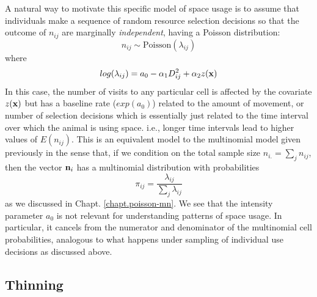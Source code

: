 A natural way to motivate this specific model of space usage is to
assume that individuals make a sequence of random resource selection
decisions so that the outcome of $n_{ij}$ are marginally {\it
  independent}, having a Poisson distribution:
\[
 n_{ij} \sim \mbox{Poisson}( \lambda_{ij})
\]
where
\[
 log(\lambda_{ij}) = a_{0} -\alpha_{1} D_{ij}^{2} +  \alpha_{2} z({\bf x})
\]
In this case,
 the number of visits to any particular cell is affected by
the covariate $z({\bf x})$ but has a baseline rate ($exp(a_{0})$) related to the amount
of movement, or number of selection decisions which is essentially
just related to the time interval over which the animal is using
space. i.e., longer time intervals lead to higher values of
$E(n_{ij})$.
This is an equivalent model to the multinomial model given previously
in the sense that, if we condition on the total sample size $n_{i.} =
\sum_{j} n_{ij}$, then the vector ${\bf n}_{i}$ has a multinomial
distribution with probabilities
\[
 \pi_{ij} = \frac{\lambda_{ij}}{ \sum_{j} \lambda_{ij}}
\]
as we discussed in Chapt. \ref{chapt.poisson-mn}.  We see that the
intensity parameter $a_{0}$ is not relevant for understanding
patterns of space usage. In particular, it cancels from the numerator
and denominator of the multinomial cell probabilities, analogous to
what happens under sampling of individual use decisions as discussed
above.

\subsection{Thinning}


